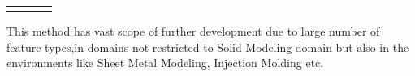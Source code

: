 \begin{longtable}{ L{0.18\textwidth} C{0.18\textwidth} L{0.38\textwidth}  C{0.18\textwidth}}
\hline
\label{DryRun}

\end{longtable}


This method has vast scope of further development due to large number of feature types,in domains not restricted to Solid Modeling domain but also in the environments like Sheet Metal Modeling, Injection Molding etc.

